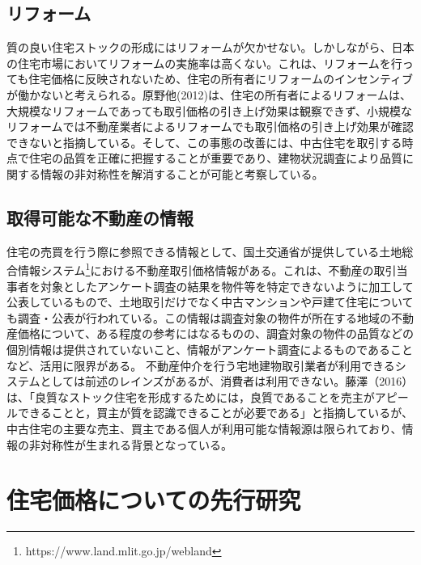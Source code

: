 \documentclass[a4paper,fontsize=11pt,report,notitlepage,line_length=38zw,number_of_lines=40,dvipdfmx]{jlreq}
\begin{document}
\subsection{リフォーム}
質の良い住宅ストックの形成にはリフォームが欠かせない。しかしながら、日本の住宅市場においてリフォームの実施率は高くない。これは、リフォームを行っても住宅価格に反映されないため、住宅の所有者にリフォームのインセンティブが働かないと考えられる。原野他(2012)\cite{harano2013}は、住宅の所有者によるリフォームは、大規模なリフォームであっても取引価格の引き上げ効果は観察できず、小規模なリフォームでは不動産業者によるリフォームでも取引価格の引き上げ効果が確認できないと指摘している。そして、この事態の改善には、中古住宅を取引する時点で住宅の品質を正確に把握することが重要であり、建物状況調査により品質に関する情報の非対称性を解消することが可能と考察している。


\subsection{取得可能な不動産の情報}
住宅の売買を行う際に参照できる情報として、国土交通省が提供している土地総合情報システム\footnote{https://www.land.mlit.go.jp/webland}における不動産取引価格情報がある。これは、不動産の取引当事者を対象としたアンケート調査の結果を物件等を特定できないように加工して公表しているもので、土地取引だけでなく中古マンションや戸建て住宅についても調査・公表が行われている。この情報は調査対象の物件が所在する地域の不動産価格について、ある程度の参考にはなるものの、調査対象の物件の品質などの個別情報は提供されていないこと、情報がアンケート調査によるものであることなど、活用に限界がある。
不動産仲介を行う宅地建物取引業者が利用できるシステムとしては前述のレインズがあるが、消費者は利用できない。藤澤（2016）\cite{fujisawa2016}
は、「良質なストック住宅を形成するためには，良質であることを売主がアピールできることと，買主が質を認識できることが必要である」と指摘しているが、中古住宅の主要な売主、買主である個人が利用可能な情報源は限られており、情報の非対称性が生まれる背景となっている。


\section{住宅価格についての先行研究}
\end{document}
